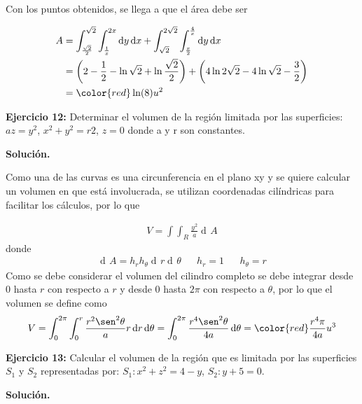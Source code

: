 \documentclass[12pt]{article}
\DeclareMathOperator{\di}{d\!}
\begin{document}
Con los puntos obtenidos, se llega a que el área debe ser

\begin{align*}
	A &= \int_{\frac{\sqrt{2}}{2}}^{\sqrt{2}}\int_{\frac{1}{x}}^{2x} \di y \di x
	+ \int_{\sqrt{2}}^{2\sqrt{2}}\int_{\frac{x}{2}}^{\frac{4}{x}} \di y \di x \\
	&=\left(2-\frac{1}{2}-\ln{\sqrt{2}}+ \ln{\frac{\sqrt{2}}{2}}\right) 
	+\left(4\ln{2\sqrt{2}}-4\ln{\sqrt{2}}-\frac{3}{2}\right) \\
	&=\color{red}\ln(8) u^2
\end{align*}

\noindent \textbf{Ejercicio 12:} Determinar el volumen de la región limitada por
 las superficies: $az = y^2$, $x^2+y^2 = r2$, $z=0$ donde a y r son constantes.

\vspace{5mm}

\noindent \textbf{Solución.}

\vspace{3mm}

Como una de las curvas es una circunferencia en el plano xy y se quiere calcular un
volumen en que está involucrada, se utilizan coordenadas cilíndricas para facilitar
los cálculos, por lo que 

\begin{align*}
	V = \int\int_{R} \frac{y^2}{a} \di A
\end{align*}
donde
\begin{align*}
	\di A = h_{r}h_{\theta} \di r \di \theta && h_{r}=1 && h_{\theta} = r
\end{align*} 
Como se debe considerar el volumen del cilindro completo se debe integrar desde
$0$ hasta $r$ con respecto a $r$ y desde $0$ hasta $2\pi$ con 
respecto a $\theta$, por lo que el volumen se define
como
\begin{align*}
	V = \int_{0}^{2\pi}\int_{0}^{r} \frac{r^2\sen^2\theta}{a}r \di r \di \theta
	= \int_0^{2\pi} \frac{r^4\sen^2\theta}{4a} \di \theta =\color{red} \frac{r^4\pi}{4a} u^3	
\end{align*} 

\noindent \textbf{Ejercicio 13:} Calcular el volumen de la región que es limitada por las superficies $S_1$ y $S_2$ representadas por: $S_1:x^2+z^2=4-y$, $S_2:y+5=0$.

\vspace{5mm}

\noindent \textbf{Solución.}

\vspace{3mm}
\end{document}
